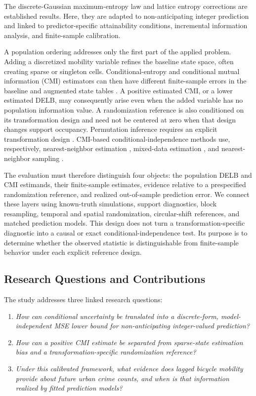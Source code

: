 The discrete-Gaussian maximum-entropy law and lattice entropy corrections are
established results. Here, they are adapted to non-anticipating integer
prediction and linked to predictor-specific attainability conditions,
incremental information analysis, and finite-sample calibration.

A population ordering addresses only the first part of the applied problem. Adding
a discretized mobility variable refines the baseline state space, often
creating sparse or singleton cells. Conditional-entropy and conditional
mutual information (CMI) estimators can then have different finite-sample
errors in the baseline and augmented state tables
\citep{paninski2003,calcagnile2026benchmark}. A positive estimated CMI, or a
lower estimated DELB, may consequently arise even when the added variable has
no population information value. A randomization reference is also
conditioned on its transformation design and need not be centered at zero
when that design changes support occupancy. Permutation inference requires an
explicit transformation design \citep{ernst2004permutation}. CMI-based
conditional-independence methods use, respectively, nearest-neighbor
estimation \citep{runge2018cmi}, mixed-data estimation \citep{zan2022cmi},
and nearest-neighbor sampling \citep{li2023nncit}.

The evaluation must therefore distinguish four objects: the population
DELB and CMI estimands, their finite-sample estimates, evidence relative to a
prespecified randomization reference, and realized out-of-sample prediction
error. We connect these layers using known-truth simulations, support
diagnostics, block resampling, temporal and spatial randomization,
circular-shift references, and matched prediction models. This design does
not turn a transformation-specific diagnostic into a causal or exact
conditional-independence test. Its purpose is to determine whether the
observed statistic is distinguishable from finite-sample behavior under each
explicit reference design.

\subsection{Research Questions and Contributions}
\label{subsec:intro_contributions}

The study addresses three linked research questions:

\begin{enumerate}
    \item \textit{How can conditional uncertainty be translated into a
    discrete-form, model-independent MSE lower bound for non-anticipating
    integer-valued prediction?}
    \item \textit{How can a positive CMI estimate be separated from
    sparse-state estimation bias and a transformation-specific randomization
    reference?}
    \item \textit{Under this calibrated framework, what evidence does lagged
    bicycle mobility provide about future urban crime counts, and when is
    that information realized by fitted prediction models?}
\end{enumerate}

